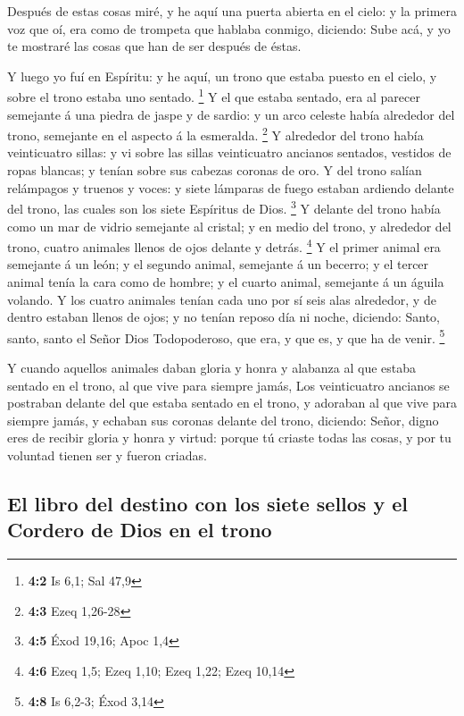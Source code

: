  Después de estas cosas miré, y he aquí una puerta abierta
en el cielo: y la primera voz que oí, era como de trompeta que hablaba
conmigo, diciendo: Sube acá, y yo te mostraré las cosas que han de ser
después de éstas.

 Y luego yo fuí en Espíritu: y he aquí, un trono que estaba
puesto en el cielo, y sobre el trono estaba uno sentado. \footnote{\textbf{4:2}
  Is 6,1; Sal 47,9}  Y el que estaba sentado, era al parecer
semejante á una piedra de jaspe y de sardio: y un arco celeste había
alrededor del trono, semejante en el aspecto á la esmeralda. \footnote{\textbf{4:3}
  Ezeq 1,26-28}  Y alrededor del trono había veinticuatro
sillas: y vi sobre las sillas veinticuatro ancianos sentados, vestidos
de ropas blancas; y tenían sobre sus cabezas coronas de oro.
 Y del trono salían relámpagos y truenos y voces: y siete
lámparas de fuego estaban ardiendo delante del trono, las cuales son los
siete Espíritus de Dios. \footnote{\textbf{4:5} Éxod 19,16; Apoc 1,4}
 Y delante del trono había como un mar de vidrio semejante
al cristal; y en medio del trono, y alrededor del trono, cuatro animales
llenos de ojos delante y detrás. \footnote{\textbf{4:6} Ezeq 1,5; Ezeq
  1,10; Ezeq 1,22; Ezeq 10,14}  Y el primer animal era
semejante á un león; y el segundo animal, semejante á un becerro; y el
tercer animal tenía la cara como de hombre; y el cuarto animal,
semejante á un águila volando.  Y los cuatro animales tenían
cada uno por sí seis alas alrededor, y de dentro estaban llenos de ojos;
y no tenían reposo día ni noche, diciendo: Santo, santo, santo el Señor
Dios Todopoderoso, que era, y que es, y que ha de venir. \footnote{\textbf{4:8}
  Is 6,2-3; Éxod 3,14}

 Y cuando aquellos animales daban gloria y honra y alabanza
al que estaba sentado en el trono, al que vive para siempre jamás,
 Los veinticuatro ancianos se postraban delante del que
estaba sentado en el trono, y adoraban al que vive para siempre jamás, y
echaban sus coronas delante del trono, diciendo:  Señor,
digno eres de recibir gloria y honra y virtud: porque tú criaste todas
las cosas, y por tu voluntad tienen ser y fueron criadas.

\hypertarget{el-libro-del-destino-con-los-siete-sellos-y-el-cordero-de-dios-en-el-trono}{%
\subsection{El libro del destino con los siete sellos y el Cordero de
Dios en el
trono}\label{el-libro-del-destino-con-los-siete-sellos-y-el-cordero-de-dios-en-el-trono}}

